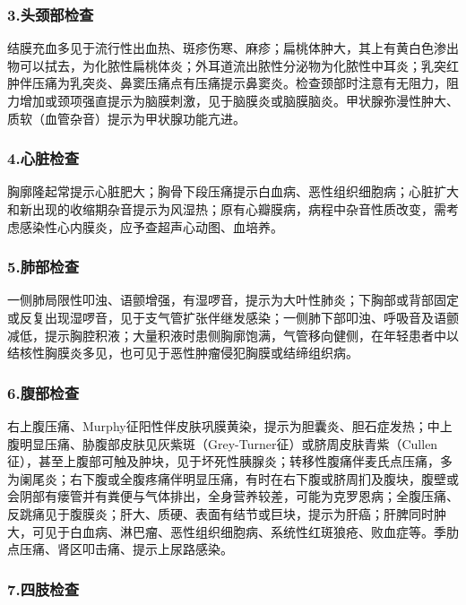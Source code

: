 \subsubsection{3.头颈部检查}

结膜充血多见于流行性出血热、斑疹伤寒、麻疹；扁桃体肿大，其上有黄白色渗出物可以拭去，为化脓性扁桃体炎；外耳道流出脓性分泌物为化脓性中耳炎；乳突红肿伴压痛为乳突炎、鼻窦压痛点有压痛提示鼻窦炎。检查颈部时注意有无阻力，阻力增加或颈项强直提示为脑膜刺激，见于脑膜炎或脑膜脑炎。甲状腺弥漫性肿大、质软（血管杂音）提示为甲状腺功能亢进。

\subsubsection{4.心脏检查}

胸廓隆起常提示心脏肥大；胸骨下段压痛提示白血病、恶性组织细胞病；心脏扩大和新出现的收缩期杂音提示为风湿热；原有心瓣膜病，病程中杂音性质改变，需考虑感染性心内膜炎，应予查超声心动图、血培养。

\subsubsection{5.肺部检查}

一侧肺局限性叩浊、语颤增强，有湿啰音，提示为大叶性肺炎；下胸部或背部固定或反复出现湿啰音，见于支气管扩张伴继发感染；一侧肺下部叩浊、呼吸音及语颤减低，提示胸腔积液；大量积液时患侧胸廓饱满，气管移向健侧，在年轻患者中以结核性胸膜炎多见，也可见于恶性肿瘤侵犯胸膜或结缔组织病。

\subsubsection{6.腹部检查}

右上腹压痛、Murphy征阳性伴皮肤巩膜黄染，提示为胆囊炎、胆石症发热；中上腹明显压痛、胁腹部皮肤见灰紫斑（Grey-Turner征）或脐周皮肤青紫（Cullen征），甚至上腹部可触及肿块，见于坏死性胰腺炎；转移性腹痛伴麦氏点压痛，多为阑尾炎；右下腹或全腹疼痛伴明显压痛，有时在右下腹或脐周扪及腹块，腹壁或会阴部有瘘管并有粪便与气体排出，全身营养较差，可能为克罗恩病；全腹压痛、反跳痛见于腹膜炎；肝大、质硬、表面有结节或巨块，提示为肝癌；肝脾同时肿大，可见于白血病、淋巴瘤、恶性组织细胞病、系统性红斑狼疮、败血症等。季肋点压痛、肾区叩击痛、提示上尿路感染。

\subsubsection{7.四肢检查}

